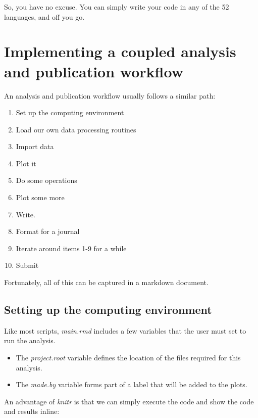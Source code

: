 \documentclass[11pt,]{article}
\providecommand{\tightlist}{%
  \setlength{\itemsep}{0pt}\setlength{\parskip}{0pt}}
\begin{document}
So, you have no excuse. You can simply write your code in any of the 52 languages, and off you go.

\hypertarget{implementing-a-coupled-analysis-and-publication-workflow}{%
\section{Implementing a coupled analysis and publication workflow}\label{implementing-a-coupled-analysis-and-publication-workflow}}

An analysis and publication workflow usually follows a similar path:

\begin{enumerate}
\def\labelenumi{\arabic{enumi}.}
\tightlist
\item
  Set up the computing environment
\item
  Load our own data processing routines
\item
  Import data
\item
  Plot it
\item
  Do some operations
\item
  Plot some more
\item
  Write.
\item
  Format for a journal
\item
  Iterate around items 1-9 for a while
\item
  Submit
\end{enumerate}

Fortunately, all of this can be captured in a markdown document.

\hypertarget{setting-up-the-computing-environment}{%
\subsection{Setting up the computing environment}\label{setting-up-the-computing-environment}}

Like most scripts, \emph{main.rmd} includes a few variables that the user must set to run the analysis.

\begin{itemize}
\tightlist
\item
  The \emph{project.root} variable defines the location of the files required for this analysis.
\item
  The \emph{made.by} variable forms part of a label that will be added to the plots.
\end{itemize}

An advantage of \emph{knitr} is that we can simply execute the code and show the code and results inline:
\end{document}
